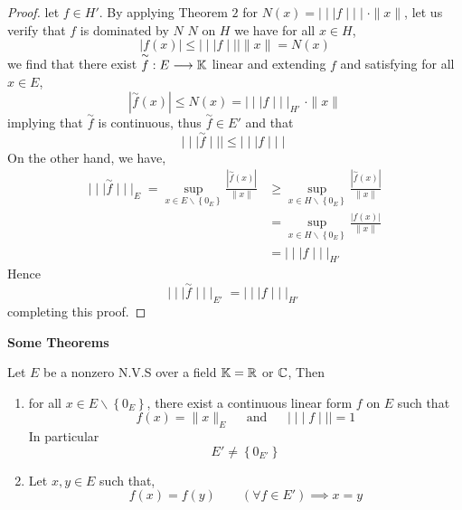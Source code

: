 \begin{proof}
let $f \in  H'$. By applying Theorem $2 $ for $N(x) = \mid \mid \mid  f \mid \mid \mid 
\cdot \| x \| $, let us verify that $f $ is dominated by $N$ %
$N $ on $H $ we have for all $x \in  H $, 
\[
\left| f(x)  \right| \leq 
\mid \mid \mid  f \mid \mid \mid  
\| x \|  = N(x) 
\]
we find that there exist $ \overset{\sim}{f}  : E \longrightarrow  \mathbb{K}$ 
linear and extending $f $ and satisfying for all $x \in  E $, 
\[
\left| \overset{\sim}{f} (x)  \right| \leq 
N(x)  = 
\mid \mid \mid  f \mid \mid \mid _{H'} \cdot \| x \| 
\]
implying that $\overset{\sim}{f}  $  is continuous, thus 
$\overset{\sim}{f} \in  E' $  and that 
\[
\mid \mid \mid  \overset{\sim}{f}  \mid \mid \mid  \leq 
\mid \mid \mid  f \mid \mid \mid 
\] 
On the other hand, we have, 
\begin{align*}
\mid \mid \mid  \overset{\sim}{f}  \mid \mid \mid _{E} 
= \sup_{x \in  E \backslash \left\{ 0_{E} \right\}}  
\frac{\left| \overset{\sim}{f} (x)  \right|}{\| x \| } & \geq
\sup_{x \in  H \backslash \left\{ 0_{E} \right\}}  
\frac{\left| \overset{\sim}{f} (x)  \right|}{\| x \| } \\
	       &= 
	       \sup_{x \in H \backslash \left\{ 0_{E} \right\}}  
	       \frac{\left| f(x)  \right|}{\| x \| } \\
	       &= 
	       \mid \mid \mid  f \mid \mid \mid _{H'}
\end{align*}
Hence 
\[
\mid \mid \mid  \overset{\sim}{f}  \mid \mid \mid  _{E'} = 
\mid \mid \mid  f \mid \mid \mid _{H'}
\]
completing this proof.
\end{proof}
\textbf{Some Theorems}
\begin{theorem}[]
Let $E $ be a nonzero N.V.S over a field $\mathbb{K} = \mathbb{R}  $ or $\mathbb{C}  $, Then
\begin{enumerate}[(1)]
\item  for all $x \in  E \backslash \left\{ 0_{E} \right\} $, there exist
	a continuous linear form $f $ on $E$ such that  
	\[
	f(x)  = \| x \| _{E} \quad \text{ and } \quad 
	\mid \mid \mid  f \mid \mid \mid  = 1
	\]
	In particular 
	\[
	E' \neq  \left\{ 0_{E'} \right\}
	\]
\item Let $x,y \in  E $ such that, 
	\[
	f(x)  = f(y) \quad \quad (\forall f \in  E') \implies 
	x = y
	\]
\end{enumerate}
\end{theorem}
